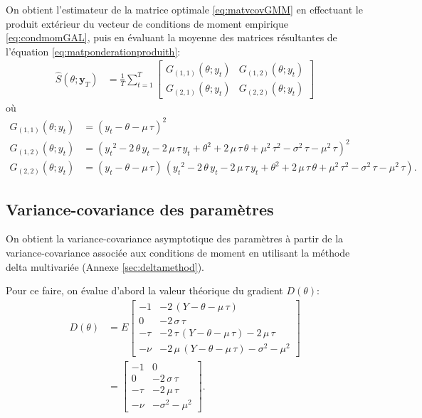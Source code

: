 On obtient l'estimateur de la matrice optimale \eqref{eq:matvcovGMM}
en effectuant le produit extérieur du vecteur de conditions de moment
empirique \eqref{eq:condmomGAL}, puis en évaluant la moyenne des
matrices résultantes de l'équation \eqref{eq:matponderationproduith}:
\begin{align}
  \label{eq:matvcovGMMemp1}
  \hat{S}(\theta;\mathbf{y}_T) &= \frac{1}{T} \sum_{t=1}^T
  \left[\begin{array}{cc}
      G_{(1,1)}(\theta;y_t) & G_{(1,2)}(\theta;y_t) \\
      G_{(2,1)}(\theta;y_t) & G_{(2,2)}(\theta;y_t)
    \end{array} \right]
\end{align}
où
\begin{align*}
  G_{(1,1)}(\theta;y_t) &=\left( y_t-\theta-\mu\,\tau\right)^{2} \\
  G_{(1,2)}(\theta;y_t) &=\left( {y_t}^{2}-2\,\theta\,y_t-2\,\mu\,\tau\,y_t+{\theta}^{2}+2\,\mu\,\tau\,\theta+{\mu}^{2}\,{\tau}^{2}-{\sigma}^{2}\,\tau-{\mu}^{2}\,\tau\right)^{2} \\
  G_{(2,2)}(\theta;y_t) &=\left( y_t-\theta-\mu\,\tau\right) \,\left(
    {y_t}^{2}-2\,\theta\,y_t-2\,\mu\,\tau\,y_t+{\theta}^{2}+2\,\mu\,\tau\,\theta+{\mu}^{2}\,{\tau}^{2}-{\sigma}^{2}\,\tau-{\mu}^{2}\,\tau\right).
\end{align*}


\subsection{Variance-covariance des paramètres}

On obtient la variance-covariance asymptotique des paramètres à partir
de la variance-covariance associée aux conditions de moment en
utilisant la méthode delta multivariée (Annexe
\ref{sec:deltamethod}). 

Pour ce faire, on évalue d'abord la valeur
théorique du gradient $D(\theta)$:
\begin{align}
  D(\theta) &= E \left[ \begin{array}{cc}
      -1 & -2\,\left( Y-\theta-\mu\,\tau\right) \\
      0 & -2\,\sigma\,\tau \\
      -\tau & -2\,\tau\,\left( Y-\theta-\mu\,\tau\right) -2\,\mu\,\tau \\
      -\nu & -2\,\mu\,\left( Y-\theta-\mu\,\tau\right)
      -{\sigma}^{2}-{\mu}^{2}
    \end{array}\right] \nonumber\\
  &= \left[ \begin{array}{cc}
      -1 & 0 \\
      0 & -2\,\sigma\,\tau \\
      -\tau & -2\,\mu\,\tau \\
      -\nu & -{\sigma}^{2}-{\mu}^{2}
    \end{array}\right].
\end{align}

